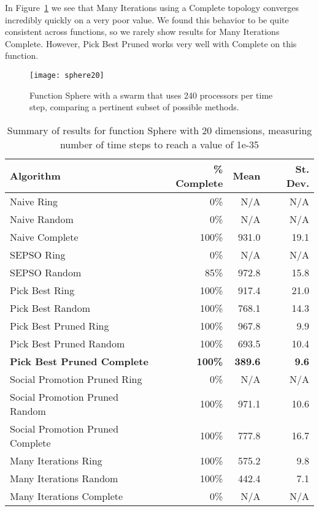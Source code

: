 \documentclass[smallcondensed]{svjour3}
\newcommand{\fig}[1]{Figure~\ref{fig:#1}}
\begin{document}
In \fig{sphere-20} we see that Many Iterations using a Complete topology
converges incredibly quickly on a very poor value.  We found this behavior to
be quite consistent across functions, so we rarely show results for Many
Iterations Complete.  However, Pick Best Pruned works very well with Complete
on this function.

\begin{figure}
  \centering
  \texttt{[image: sphere20]}
  \caption{Function Sphere with a swarm that uses 240 processors per time step,
  comparing a pertinent subset of possible methods.}
  \label{fig:sphere-20}
\end{figure}

\begin{table}
  \caption{Summary of results for function Sphere with 20 dimensions,
  measuring number of time steps to reach a value of 1e-35}
  \label{tab:sphere-20}
  \centering
  \begin{tabular}{|l|r|r|r|}
  \hline
  Algorithm&\% Complete&Mean&St. Dev.\\
  \hline
  \hline
  Naive Ring&0\%&N/A&N/A\\
  \hline
  Naive Random&0\%&N/A&N/A\\
  \hline
  Naive Complete&100\%&931.0&19.1\\
  \hline
  SEPSO Ring&0\%&N/A&N/A\\
  \hline
  SEPSO Random&85\%&972.8&15.8\\
  \hline
  Pick Best Ring&100\%&917.4&21.0\\
  \hline
  Pick Best Random&100\%&768.1&14.3\\
  \hline
  Pick Best Pruned Ring&100\%&967.8&9.9\\
  \hline
  Pick Best Pruned Random&100\%&693.5&10.4\\
  \hline
  \textbf{Pick Best Pruned Complete}&\textbf{100\%}&\textbf{389.6}&
    \textbf{9.6}\\
  \hline
  Social Promotion Pruned Ring&0\%&N/A&N/A\\
  \hline
  Social Promotion Pruned Random&100\%&971.1&10.6\\
  \hline
  Social Promotion Pruned Complete&100\%&777.8&16.7\\
  \hline
  Many Iterations Ring&100\%&575.2&9.8\\
  \hline
  Many Iterations Random&100\%&442.4&7.1\\
  \hline
  Many Iterations Complete&0\%&N/A&N/A\\
  \hline
  \end{tabular}
\end{table}
\end{document}
